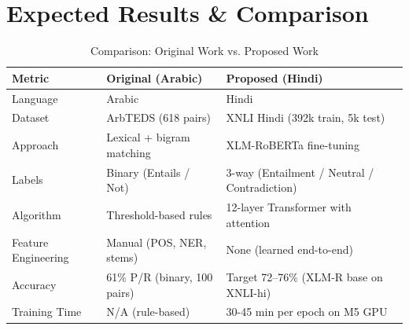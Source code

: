 \section{Expected Results \& Comparison}

\begin{table}[h]
\centering
\caption{Comparison: Original Work vs. Proposed Work}
\begin{tabularx}{\textwidth}{lXX}
\toprule
\textbf{Metric} & \textbf{Original (Arabic)} & \textbf{Proposed (Hindi)} \\
\midrule
Language & Arabic & Hindi \\
Dataset & ArbTEDS (618 pairs) & XNLI Hindi (392k train, 5k test) \\
Approach & Lexical + bigram matching & XLM-RoBERTa fine-tuning \\
Labels & Binary (Entails / Not) & 3-way (Entailment / Neutral / Contradiction) \\
Algorithm & Threshold-based rules & 12-layer Transformer with attention \\
Feature Engineering & Manual (POS, NER, stems) & None (learned end-to-end) \\
Accuracy & 61\% P/R (binary, 100 pairs) & Target 72--76\% (XLM-R base on XNLI-hi) \\
Training Time & N/A (rule-based) & 30-45 min per epoch on M5 GPU \\
\bottomrule
\end{tabularx}
\end{table}
